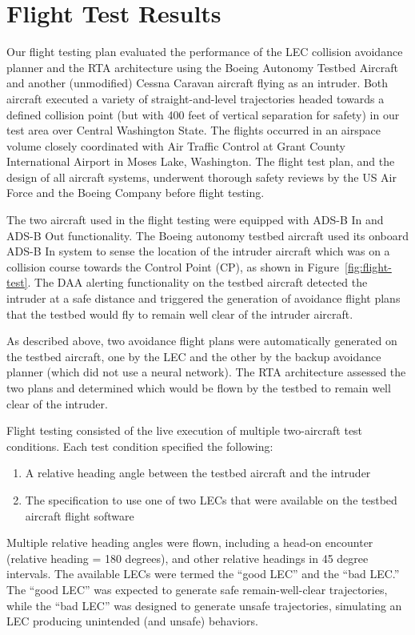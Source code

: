 \section{Flight Test Results}

Our flight testing plan evaluated the performance of the LEC collision avoidance planner and the RTA architecture using the Boeing Autonomy Testbed Aircraft and another (unmodified) Cessna Caravan aircraft flying as an intruder.  Both aircraft executed a variety of straight-and-level trajectories headed towards a defined collision point (but with 400 feet of vertical separation for safety) in our test area over Central Washington State.  The flights occurred in an airspace volume closely coordinated with Air Traffic Control at Grant County International Airport in Moses Lake, Washington.  The flight test plan, and the design of all aircraft systems, underwent thorough safety reviews by the US Air Force and the Boeing Company before flight testing.

The two aircraft used in the flight testing were equipped with ADS-B In and ADS-B Out functionality.  The Boeing autonomy testbed aircraft used its onboard ADS-B In system to sense the location of the intruder aircraft which was on a collision course towards the Control Point (CP), as shown in Figure~\ref{fig:flight-test}.  The DAA alerting functionality on the testbed aircraft detected the intruder at a safe distance and triggered the generation of avoidance flight plans that the testbed would fly to remain well clear of the intruder aircraft.  

As described above, two avoidance flight plans were automatically generated on the testbed aircraft, one by the LEC and the other by the backup avoidance planner (which did not use a neural network).
The RTA architecture assessed the two plans and determined which would be flown by the testbed to remain well clear of the intruder.

Flight testing consisted of the live execution of multiple two-aircraft test conditions.  Each test condition specified the following:
\begin{enumerate}
\item A relative heading angle between the testbed aircraft and the intruder
\item The specification to use one of two LECs that were available on the testbed aircraft flight software
\end{enumerate}

Multiple relative heading angles were flown, including a head-on encounter (relative heading = 180 degrees), and other relative headings in 45 degree intervals.
The available LECs were termed the ``good LEC'' and the ``bad LEC.''  The ``good LEC'' was expected to generate safe remain-well-clear trajectories, while the ``bad LEC'' was designed to generate unsafe trajectories, simulating an LEC producing unintended (and unsafe) behaviors.  

